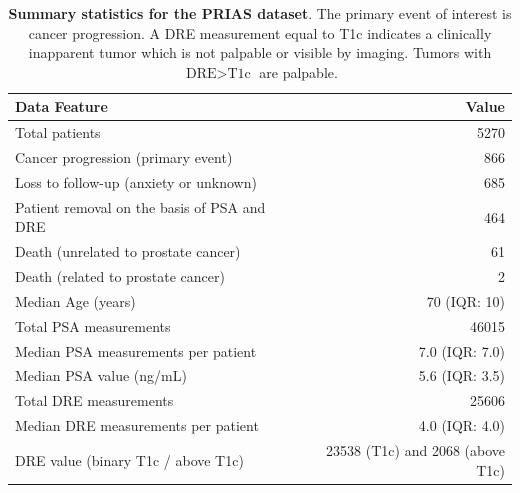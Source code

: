 \begin{table}
\small\sf\centering
\caption{\textbf{Summary statistics for the PRIAS dataset}. The primary event of interest is cancer progression. A DRE measurement equal to T1c\cite{schroder1992tnm} indicates a clinically inapparent tumor which is not palpable or visible by imaging. Tumors with $\mbox{DRE} > \mbox{T1c}$ are palpable.}
\label{table:prias_summary}
\begin{tabular}{lr}
\toprule
Data Feature & Value\\
\midrule
Total patients & 5270\\
Cancer progression (primary event) & 866\\
Loss to follow-up (anxiety or unknown) & 685\\
Patient removal on the basis of PSA and DRE & 464\\
Death (unrelated to prostate cancer) & 61\\
Death (related to prostate cancer) & 2\\
Median Age (years) & 70 (IQR: 10)\\
Total PSA measurements & 46015\\
Median PSA measurements per patient &  7.0 (IQR: 7.0)\\
Median PSA value (ng/mL) & 5.6 (IQR: 3.5)\\
Total DRE measurements & 25606\\
Median DRE measurements per patient & 4.0 (IQR: 4.0)\\
DRE value (binary T1c / above T1c) & 23538 (T1c) and 2068 (above T1c)\\
\bottomrule
\end{tabular}
\end{table}

